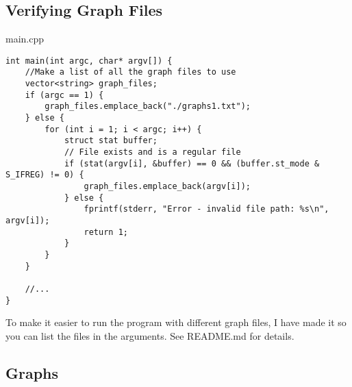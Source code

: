 \documentclass[letterpaper, 10pt,DIV=13]{scrartcl}
\numberwithin{equation}{section} %
\numberwithin{figure}{section} %
\numberwithin{table}{section} %
\begin{document}
\subsection{Verifying Graph Files}

main.cpp
\begin{verbatim}
int main(int argc, char* argv[]) {
    //Make a list of all the graph files to use
    vector<string> graph_files;
    if (argc == 1) {
        graph_files.emplace_back("./graphs1.txt");
    } else {
        for (int i = 1; i < argc; i++) {
            struct stat buffer;
            // File exists and is a regular file
            if (stat(argv[i], &buffer) == 0 && (buffer.st_mode & S_IFREG) != 0) {
                graph_files.emplace_back(argv[i]);
            } else {
                fprintf(stderr, "Error - invalid file path: %s\n", argv[i]);
                return 1;
            }
        }
    }

    //...
}
\end{verbatim}

To make it easier to run the program with different graph files, I have made it so you can list the files
in the arguments. See README.md for details.

\subsection{Graphs}
\end{document}
